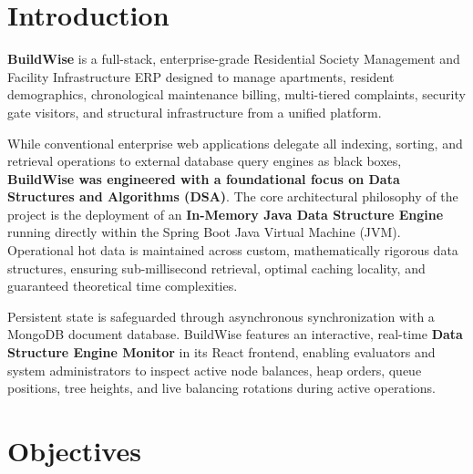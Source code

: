 \documentclass[12pt,a4paper]{article}
\begin{document}
\tableofcontents
\newpage
{}

\section{Introduction}

\textbf{BuildWise} is a full-stack, enterprise-grade Residential Society Management and Facility Infrastructure ERP designed to manage apartments, resident demographics, chronological maintenance billing, multi-tiered complaints, security gate visitors, and structural infrastructure from a unified platform. 

While conventional enterprise web applications delegate all indexing, sorting, and retrieval operations to external database query engines as black boxes, \textbf{BuildWise was engineered with a foundational focus on Data Structures and Algorithms (DSA)}. The core architectural philosophy of the project is the deployment of an \textbf{In-Memory Java Data Structure Engine} running directly within the Spring Boot Java Virtual Machine (JVM). Operational hot data is maintained across custom, mathematically rigorous data structures, ensuring sub-millisecond retrieval, optimal caching locality, and guaranteed theoretical time complexities.

Persistent state is safeguarded through asynchronous synchronization with a MongoDB document database. BuildWise features an interactive, real-time \textbf{Data Structure Engine Monitor} in its React frontend, enabling evaluators and system administrators to inspect active node balances, heap orders, queue positions, tree heights, and live balancing rotations during active operations.

\section{Objectives}
\end{document}
